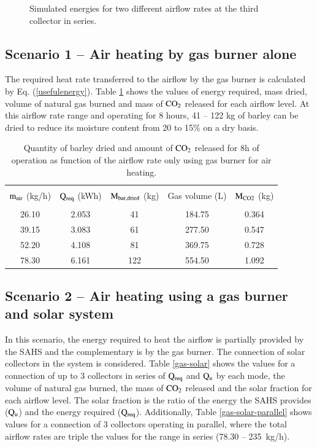 \begin{figure}[ht!]
\begin{minipage}{0.50\columnwidth}
	\end{minipage}
	\caption{Simulated energies for two different airflow rates at the third collector in series.}
	\label{dry_3col}
\end{figure}

\subsection{Scenario 1 -- Air heating by gas burner alone}

The required heat rate transferred to the airflow by the gas burner is calculated by Eq. (\ref{usefulenergy}). Table \ref{gas-only} shows the values of energy required, mass dried, volume of natural gas burned and mass of $\rm{CO_2}$ released for each airflow level. At this airflow rate range and operating for 8 hours, 41 -- 122 kg of barley can be dried to reduce its moisture content from 20 to 15\% on a dry basis.

\begin{table}[h]
	\caption{Quantity of barley dried and amount of $\rm{CO_2}$ released for 8h of operation as function of the airflow rate only using gas burner for air heating.}
	\centering
	
	\begin{tabular}{ccccc}
		\hline \\ [-10pt]
		$\rm{m_{air}}$ (kg/h) & $\rm{Q_{req}}$ (kWh) & $\rm{M_{bar,dried}}$ (kg) & Gas volume (L) & $\rm{M_{CO2}}$ (kg) \\
		\hline \\ [-12pt]
		26.10 & 2.053 & 41 & 184.75 & 0.364 \\ [2pt]
		39.15 & 3.083 & 61 & 277.50 & 0.547 \\ [2pt]
		52.20 & 4.108 & 81 & 369.75 & 0.728 \\ [2pt]
		78.30 & 6.161 & 122 & 554.50 & 1.092 \\ 
		\hline
	\end{tabular}
	
	\label{gas-only}
\end{table}



\subsection{Scenario 2 -- Air heating using a gas burner and solar system}

In this scenario, the energy required to heat the airflow is partially provided by the SAHS and the complementary is by the gas burner. The connection of solar collectors in the system is considered. Table \ref{gas-solar} shows the values for a connection of up to 3 collectors in series of $\rm{Q_{req}}$ and $\rm{Q_u}$ by each mode, the volume of natural gas burned, the mass of $\rm{CO_2}$ released and the solar fraction for each airflow level. The solar fraction is the ratio of the energy the SAHS provides ($\rm{Q_u}$) and the energy required ($\rm{Q_{req}}$). Additionally, Table \ref{gas-solar-parallel} shows values for a connection of 3 collectors operating in parallel, where the total airflow rates are triple the values for the range in series (78.30 -- 235~kg/h).


